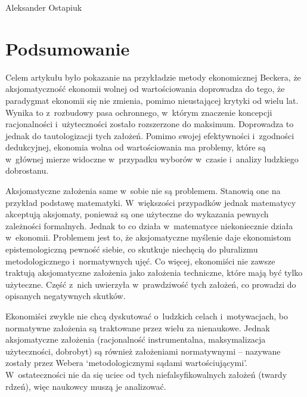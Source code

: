 \begin{artplenv}{Aleksander Ostapiuk}
\section*{Podsumowanie}
Celem artykułu było pokazanie na przykładzie metody ekonomicznej Beckera, że aksjomatyczność ekonomii wolnej od
wartościowania doprowadza do tego, że paradygmat ekonomii się nie zmienia, pomimo nieustającej krytyki od wielu lat.
Wynika to z~rozbudowy pasa ochronnego, w~którym znaczenie koncepcji racjonalności i~użyteczności zostało rozszerzone do
maksimum. Doprowadza to jednak do tautologizacji tych założeń. Pomimo swojej efektywności i~zgodności dedukcyjnej,
ekonomia wolna od wartościowania ma problemy, które są w~głównej mierze widoczne w~przypadku wyborów w~czasie i~analizy
ludzkiego dobrostanu.

Aksjomatyczne założenia same w~sobie nie są problemem. Stanowią one na przykład podstawę matematyki. W~większości
przypadków jednak matematycy akceptują aksjomaty, ponieważ są one użyteczne do wykazania pewnych zależności formalnych.
Jednak to co działa w~matematyce niekoniecznie działa w~ekonomii. Problemem jest to, że aksjomatyczne myślenie daje
ekonomistom epistemologiczną pewność siebie, co skutkuje niechęcią do pluralizmu metodologicznego i~normatywnych ujęć.
Co więcej, ekonomiści nie zawsze traktują aksjomatyczne założenia jako założenia techniczne, które mają być tylko
użyteczne. Część z~nich uwierzyła w~prawdziwość tych założeń, co prowadzi do opisanych negatywnych skutków.

Ekonomiści zwykle nie chcą dyskutować o~ludzkich celach i~motywacjach, bo normatywne założenia są traktowane przez wielu
za nienaukowe. Jednak aksjomatyczne założenia (racjonalność instrumentalna, maksymalizacja użyteczności, dobrobyt) są
również założeniami normatywnymi -- nazywane zostały przez Webera
\parencite*{weber_methodology_1949}
`metodologicznymi
sądami wartościującymi'. W~ostateczności nie da się uciec od tych niefalsyfikowalnych założeń (twardy rdzeń), więc
naukowcy muszą je analizować.


\end{artplenv}
